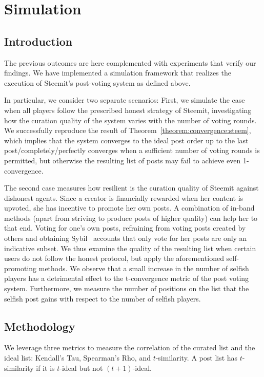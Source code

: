 \section{Simulation}
  \subsection{Introduction}
    The previous outcomes are here complemented with experiments that verify our
    findings. We have implemented a simulation framework that realizes the
    execution of Steemit's post-voting system as defined above.

    In particular, we consider two separate scenarios: First, we simulate the
    case when all players follow the prescribed honest strategy of Steemit,
    investigating how the curation quality of the system varies with the number
    of voting rounds. We successfully reproduce the result of
    Theorem~\ref{theorem:convergence:steem}, which implies that the system
    converges to the ideal post order up to the last post/completely/perfectly
    converges when a sufficient number of voting rounds is permitted, but
    otherwise the resulting list of posts may fail to achieve even
    1-convergence.

    The second case measures how resilient is the curation quality of Steemit
    against dishonest agents. Since a creator is financially rewarded when her
    content is upvoted, she has incentive to promote her own posts. A
    combination of in-band methods (apart from striving to produce posts of
    higher quality) can help her to that end. Voting for one's own posts,
    refraining from voting posts created by others and obtaining
    Sybil~\cite{sybilattack} accounts that only vote for her posts are only an
    indicative subset. We thus examine the quality of the resulting list when
    certain users do not follow the honest protocol, but apply the
    aforementioned self-promoting methods. We observe that a small increase in
    the number of selfish players has a detrimental effect to the t-convergence
    metric of the post voting system. Furthermore, we measure the number of
    positions on the list that the selfish post gains with respect to the number
    of selfish players.

  \subsection{Methodology}
    We leverage three metrics to measure the correlation of the curated list and
    the ideal list: Kendall's Tau, Spearman's Rho, and $t$-similarity. A post
    list has $t$-similarity if it is $t$-ideal but not $\left(t +
    1\right)$-ideal.

